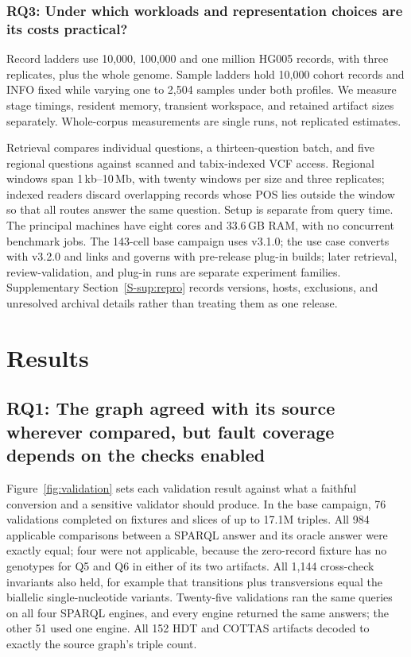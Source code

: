 \documentclass[pdflatex,sn-mathphys-num]{sn-jnl}
\begin{document}
\subsubsection{RQ3: Under which workloads and representation choices are its costs practical?}\label{subsec:execution}
Record ladders use 10,000, 100,000 and one million HG005 records, with three replicates, plus the whole genome. 
Sample ladders hold 10,000 cohort records and INFO fixed while varying one to 2,504 samples under both profiles. 
We measure stage timings, resident memory, transient workspace, and retained artifact sizes separately. 
Whole-corpus measurements are single runs, not replicated estimates.

Retrieval compares individual questions, a thirteen-question batch, and five regional questions against scanned and tabix-indexed VCF access. 
Regional windows span 1\,kb--10\,Mb, with twenty windows per size and three replicates; indexed readers discard overlapping records whose POS lies outside the window so that all routes answer the same question. 
Setup is separate from query time. The principal machines have eight cores and 33.6\,GB RAM, with no concurrent benchmark jobs. 
The 143-cell base campaign uses v3.1.0; the use case converts with v3.2.0 and links and governs with pre-release plug-in builds; later retrieval, review-validation, and plug-in runs are separate experiment families. 
Supplementary Section~\ref{S-sup:repro} records versions, hosts, exclusions, and unresolved archival details rather than treating them as one release.

\section{Results}\label{sec3}
\subsection{RQ1: The graph agreed with its source wherever compared, but fault coverage depends on the checks enabled}\label{subsec3.5}
Figure~\ref{fig:validation} sets each validation result against what a faithful conversion and a sensitive validator should produce. 
In the base campaign, 76 validations completed on fixtures and slices of up to 17.1M triples. 
All 984 applicable comparisons between a SPARQL answer and its oracle answer were exactly equal; four were not applicable, because the zero-record fixture has no genotypes for Q5 and Q6 in either of its two artifacts. 
All 1,144 cross-check invariants also held, for example that transitions plus transversions equal the biallelic single-nucleotide variants. 
Twenty-five validations ran the same queries on all four SPARQL engines, and every engine returned the same answers; the other 51 used one engine. 
All 152 HDT and COTTAS artifacts decoded to exactly the source graph's triple count.
\end{document}
